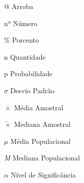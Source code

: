\begin{simbolos}
  \item[@] Arroba
  \item[nº] Número
  \item[\%] Porcento 
  \item[n] Quantidade
  \item[p] Probabilidade
  \item[$\sigma$] Desvio Padrão
  \item[$\overline{\times}$] Média Amostral
  \item[$\tilde{\times}$] Mediana Amostral
  \item[$\mu$] Média Populacional
  \item[\textit{M}] Mediana Populacional
  \item[$\alpha$] Nível de Significância 
\end{simbolos}


